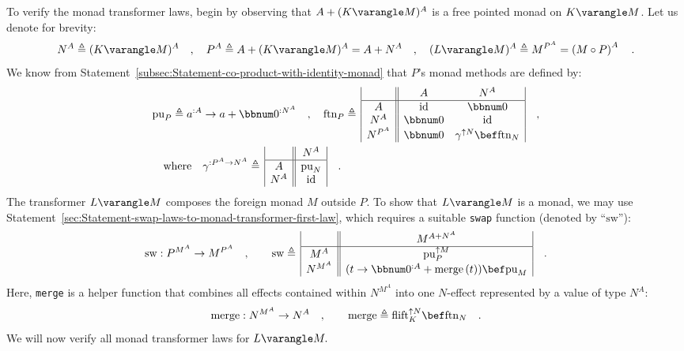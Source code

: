 To verify the monad transformer laws, begin by observing that $A+(K\varangle M)^{A}$
is a free pointed monad on $K\varangle M$. Let us denote for brevity:
\[
N^{A}\triangleq(K\varangle M)^{A}\quad,\quad P^{A}\triangleq A+(K\varangle M)^{A}=A+N^{A}\quad,\quad(L\varangle M)^{A}\triangleq M^{P^{A}}=\left(M\circ P\right)^{A}\quad.
\]
We know from Statement~\ref{subsec:Statement-co-product-with-identity-monad}
that $P$\textsf{'}s monad methods are defined by:
\begin{align*}
 & \text{pu}_{P}\triangleq a^{:A}\rightarrow a+\bbnum 0^{:N^{A}}\quad,\quad\text{ftn}_{P}\triangleq\,\begin{array}{|c||cc|}
 & A & N^{A}\\
\hline A & \text{id} & \bbnum 0\\
N^{A} & \bbnum 0 & \text{id}\\
N^{P^{A}} & \bbnum 0 & \gamma^{\uparrow N}\bef\text{ftn}_{N}
\end{array}\quad,\\
 & \quad\text{where}\quad\gamma^{:P^{A}\rightarrow N^{A}}\triangleq\,\begin{array}{|c||c|}
 & N^{A}\\
\hline A & \text{pu}_{N}\\
N^{A} & \text{id}
\end{array}\quad.
\end{align*}
The transformer $L\varangle M$ composes the foreign monad $M$ outside
$P$. To show that $L\varangle M$ is a monad, we may use Statement~\ref{sec:Statement-swap-laws-to-monad-transformer-first-law},
which requires a suitable \lstinline!swap! function (denoted by \textsf{``}$\text{sw}$\textsf{''}):
\begin{equation}
\text{sw}:P^{M^{A}}\rightarrow M^{P^{A}}\quad,\quad\quad\text{sw}\triangleq\,\begin{array}{|c||c|}
 & M^{A+N^{A}}\\
\hline M^{A} & \text{pu}_{P}^{\uparrow M}\\
N^{M^{A}} & (t\rightarrow\bbnum 0^{:A}+\text{merge}\,(t))\bef\text{pu}_{M}
\end{array}\quad.\label{eq:def-of-swap-for-free-pointed-monad-transformer}
\end{equation}
Here, \lstinline!merge! is a helper function that combines all effects
contained within $N^{M^{A}}$ into one $N$-effect represented by
a value of type $N^{A}$:
\[
\text{merge}:N^{M^{A}}\rightarrow N^{A}\quad,\quad\quad\text{merge}\triangleq\text{flift}_{K}^{\uparrow N}\bef\text{ftn}_{N}\quad.
\]
We will now verify all monad transformer laws for $L\varangle M.$


